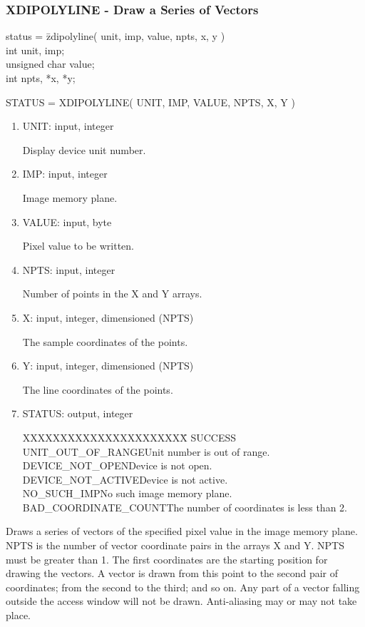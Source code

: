 \subsubsection{XDIPOLYLINE - Draw a Series of Vectors}
\begin{tabbing}
status = \=zdipolyline( unit, imp, value, npts, x, y )\\
\>int  unit, imp;\\
\>unsigned char  value;\\
\>int  npts, *x, *y;\\
\end{tabbing}
STATUS = XDIPOLYLINE( UNIT, IMP, VALUE, NPTS, X, Y )
\begin{enumerate}
\item UNIT:  input, integer

Display device unit number.
\item IMP:  input, integer

Image memory plane.
\item VALUE:  input, byte

Pixel value to be written.
\item NPTS:  input, integer

Number of points in the X and Y arrays.
\item X:  input, integer, dimensioned (NPTS)

The sample coordinates of the points.
\item Y:  input, integer, dimensioned (NPTS)

The line coordinates of the points.
\item STATUS:  output, integer
\begin{tabbing}
XXXXXXXXXXXXXXXXXXXXXX\=\kill
SUCCESS\\
UNIT\_OUT\_OF\_RANGE\>Unit number is out of range.\\
DEVICE\_NOT\_OPEN\>Device is not open.\\
DEVICE\_NOT\_ACTIVE\>Device is not active.\\
NO\_SUCH\_IMP\>No such image memory plane.\\
BAD\_COORDINATE\_COUNT\>The number of coordinates is less than 2.\\
\end{tabbing}
\end{enumerate}
Draws a series of vectors of the specified pixel value in the image
memory plane.  NPTS is the number of vector coordinate pairs in the
arrays X and Y.  NPTS must be greater than 1.  The first coordinates
are the starting position for drawing the vectors.  A vector is drawn
from this point to the second pair of coordinates; from the second to
the third; and so on.  Any part of a vector falling outside the
access window will not be drawn.  Anti-aliasing may or may not take
place.
\newpage
